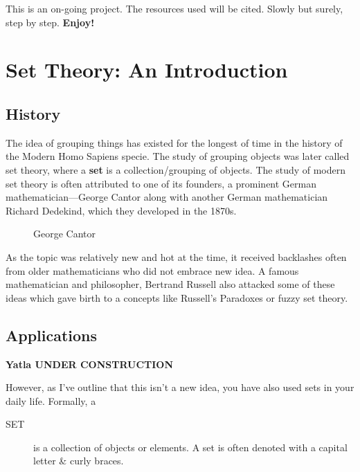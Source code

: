 \documentclass[
  letterpaper,
  DIV=11,
  numbers=noendperiod]{scrreprt}
\makeatletter
\newcommand*\pandocbounded[1]{%
  \sbox\pandoc@box{#1}%
  \Gscale@div\@tempa{\textheight}{\dimexpr\ht\pandoc@box+\dp\pandoc@box\relax}%
  \Gscale@div\@tempb{\linewidth}{\wd\pandoc@box}%
  \ifdim\@tempb\p@<\@tempa\p@\let\@tempa\@tempb\fi%
  \ifdim\@tempa\p@<\p@\scalebox{\@tempa}{\usebox\pandoc@box}%
  \else\usebox{\pandoc@box}%
  \fi%
}
\makeatother
\begin{document}
This is an on-going project. The resources used will be cited. Slowly
but surely, step by step. \textbf{Enjoy!}


\chapter{Set Theory: An Introduction}\label{set-theory-an-introduction}

\section{History}\label{history}

The idea of grouping things has existed for the longest of time in the
history of the Modern Homo Sapiens specie. The study of grouping objects
was later called set theory, where a \textbf{set} is a
collection/grouping of objects. The study of modern set theory is often
attributed to one of its founders, a prominent German
mathematician---George Cantor along with another German mathematician
Richard Dedekind, which they developed in the 1870s.

\begin{figure}[H]

{\centering \pandocbounded{\texttt{[image: images/G.Cantor.jpeg]}}

}

\caption{George Cantor}

\end{figure}%

As the topic was relatively new and hot at the time, it received
backlashes often from older mathematicians who did not embrace new idea.
A famous mathematician and philosopher, Bertrand Russell also attacked
some of these ideas which gave birth to a concepts like Russell's
Paradoxes or fuzzy set theory.

\section{Applications}\label{applications}

\textbf{Yatla \textbar{} UNDER CONSTRUCTION}

However, as I've outline that this isn't a new idea, you have also used
sets in your daily life. Formally, a

\begin{description}
\item[SET]
is a collection of objects or elements. A set is often denoted with a
capital letter \& curly braces.
\end{description}
\end{document}
